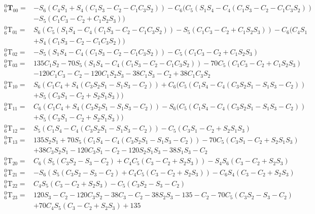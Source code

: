 \documentclass[12pt]{article}
\begin{document}
\begin{CJK}{UTF8}{bsmi}
\begin{equation*}
\begin{split}
^0_6\mathbf{T}_{00} = &- S_6(C_4S_1 + S_4(C_1S_3-C_2 - C_1C_3S_2)) - C_6(C_5(S_1S_4 - C_4(C_1S_3-C_2 - C_1C_3S_2))\\
					& - S_5(C_1C_3-C_2 + C_1S_2S_3))\\
^0_6\text{T}_{01} = &S_6(C_5(S_1S_4 - C_4(C_1S_3-C_2 - C_1C_3S_2)) - S_5(C_1C_3-C_2 + C_1S_2S_3))- C_6(C_4S_1\\
					& + S_4(C_1S_3-C_2 - C_1C_3S_2))\\
^0_6\text{T}_{02} = &- S_5(S_1S_4 - C_4(C_1S_3-C_2 - C_1C_3S_2)) - C_5(C_1C_3-C_2 + C_1S_2S_3)\\
^0_6\text{T}_{03} = &135C_1S_2 - 70S_5(S_1S_4 - C_4(C_1S_3-C_2 - C_1C_3S_2)) - 70C_5(C_1C_3-C_2 + C_1S_2S_3)\\
					& - 120C_1C_3-C_2 - 120C_1S_2S_3 - 38C_1S_3-C_2 + 38C_1C_3S_2\\
^0_6\text{T}_{10} = &S_6(C_1C_4 + S_4(C_3S_2S_1 - S_1S_3-C_2)) + C_6(C_5(C_1S_4 - C_4(C_3S_2S_1 - S_1S_3-C_2))\\
					& + S_5(C_3S_1-C_2 + S_2S_1S_3))\\
^0_6\text{T}_{11} = &C_6(C_1C_4 + S_4(C_3S_2S_1 - S_1S_3-C_2)) - S_6(C_5(C_1S_4 - C_4(C_3S_2S_1 - S_1S_3-C_2))\\
					& + S_5(C_3S_1-C_2 + S_2S_1S_3))\\
^0_6\text{T}_{12} = &S_5(C_1S_4 - C_4(C_3S_2S_1 - S_1S_3-C_2)) - C_5(C_3S_1-C_2 + S_2S_1S_3)\\
^0_6\text{T}_{13} = &135S_2S_1 + 70S_5(C_1S_4 - C_4(C_3S_2S_1 - S_1S_3-C_2)) - 70C_5(C_3S_1-C_2 + S_2S_1S_3)\\
					& + 38C_3S_2S_1 - 120C_3S_1-C_2 - 120S_2S_1S_3 - 38S_1S_3-C_2\\
^0_6\text{T}_{20} = &C_6(S_5(C_3S_2 - S_3-C_2) + C_4C_5(C_3-C_2 + S_2S_3)) - S_4S_6(C_3-C_2 + S_2S_3)\\
^0_6\text{T}_{21} = &- S_6(S_5(C_3S_2 - S_3-C_2) + C_4C_5(C_3-C_2 + S_2S_3)) - C_6S_4(C_3-C_2 + S_2S_3)\\
^0_6\text{T}_{22} = &C_4S_5(C_3-C_2 + S_2S_3) - C_5(C_3S_2 - S_3-C_2)\\
^0_6\text{T}_{23} = &120S_3-C_2 - 120C_3S_2 - 38C_3-C_2 - 38S_2S_3 - 135-C_2 - 70C_5(C_3S_2 - S_3-C_2)\\
					& + 70C_4S_5(C_3-C_2 + S_2S_3) + 135\\
\end{split}
\end{equation*}


\end{CJK}
\end{document}

